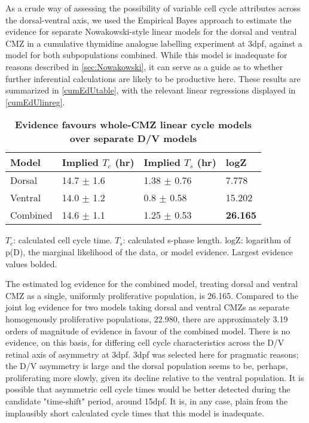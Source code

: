 As a crude way of assessing the possibility of variable cell cycle attributes across the dorsal-ventral axis, we used the Empirical Bayes approach to estimate the evidence for separate Nowakowski-style \cite{Nowakowski1989} linear models for the dorsal and ventral CMZ in a cumulative thymidine analogue labelling experiment at 3dpf, against a model for both subpopulations combined. While this model is inadequate for reasons described in \autoref{sec:Nowakowski}, it can serve as a guide as to whether further inferential calculations are likely to be productive here. These results are summarized in \autoref{cumEdUtable}, with the relevant linear regressions displayed in \autoref{cumEdUlinreg}.

\begin{table}[!ht]
    \centering
    \caption{{\bf Evidence favours whole-CMZ linear cycle models over separate D/V models}}
    \begin{tabular}{|l|l|l|l|} 
        \hline {\bf Model} & {\bf Implied $T_c$ (hr)} & {\bf Implied $T_s$ (hr)} & {\bf logZ}\\
        \hline Dorsal & 14.7 $\pm$ 1.6 & 1.38 $\pm$ 0.76 & 7.778\\
        \hline Ventral & 14.0 $\pm$ 1.2 & 0.8 $\pm$ 0.58 & 15.202\\
        \hline Combined & 14.6 $\pm$ 1.1 & 1.25 $\pm$ 0.53 & {\bf26.165}\\ \hline
    \end{tabular}
   
    \begin{flushleft} $T_c$: calculated cell cycle time. $T_s$: calculated s-phase length. logZ: logarithm of p(D), the marginal likelihood of the data, or model evidence.  Largest evidence values bolded.
    \end{flushleft}
    \label{cumEdUtable}
\end{table}

The estimated log evidence for the combined model, treating dorsal and ventral CMZ as a single, uniformly proliferative population, is 26.165. Compared to the joint log evidence for two models taking dorsal and ventral CMZs as separate homogenously proliferative populations, 22.980, there are approximately 3.19 orders of magnitude of evidence in favour of the combined model. There is no evidence, on this basis, for differing cell cycle characteristics across the D/V retinal axis of asymmetry at 3dpf. 3dpf was selected here for pragmatic reasons; the D/V asymmetry is large and the dorsal population seems to be, perhaps, proliferating more slowly, given its decline relative to the ventral population. It is possible that asymmetric cell cycle times would be better detected during the candidate "time-shift" period, around 15dpf. It is, in any case, plain from the implausibly short calculated cycle times that this model is inadequate. 

